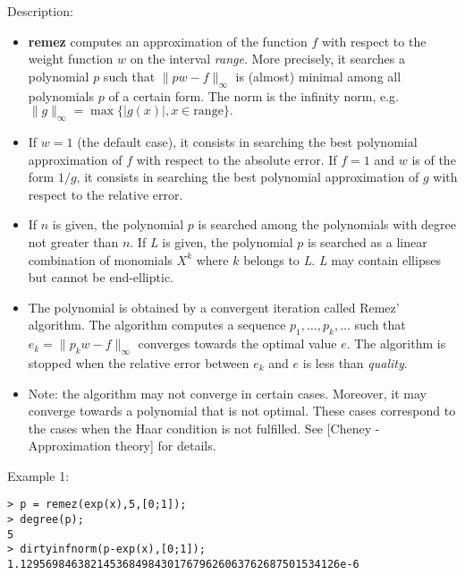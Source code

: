 \noindent Description: \begin{itemize}

\item \textbf{remez} computes an approximation of the function $f$ with respect to 
   the weight function $w$ on the interval \emph{range}. More precisely, it 
   searches a polynomial $p$ such that $\|pw-f\|_{\infty}$ is 
   (almost) minimal among all polynomials $p$ of a certain form. The norm is
   the infinity norm, e.g. $\|g\|_{\infty} = \max \{|g(x)|, x \in \mathrm{range}\}.$

\item If $w=1$ (the default case), it consists in searching the best 
   polynomial approximation of $f$ with respect to the absolute error.
   If $f=1$ and $w$ is of the form $1/g$, it consists in 
   searching the best polynomial approximation of $g$ with respect to the 
   relative error.

\item If $n$ is given, the polynomial $p$ is searched among the 
   polynomials with degree not greater than $n$.
   If \emph{L} is given, the polynomial $p$ is searched as a linear combination 
   of monomials $X^k$ where $k$ belongs to \emph{L}.
   \emph{L} may contain ellipses but cannot be end-elliptic.

\item The polynomial is obtained by a convergent iteration called Remez' algorithm. 
   The algorithm computes a sequence $p_1,\dots ,p_k,\dots$ 
   such that $e_k = \|p_k w-f\|_{\infty}$ converges towards 
   the optimal value $e$. The algorithm is stopped when the relative error 
   between $e_k$ and $e$ is less than \emph{quality}.

\item Note: the algorithm may not converge in certain cases. Moreover, it may 
   converge towards a polynomial that is not optimal. These cases correspond to 
   the cases when the Haar condition is not fulfilled.
   See [Cheney - Approximation theory] for details.
\end{itemize}
\noindent Example 1: 
\begin{center}\begin{minipage}{15cm}\begin{Verbatim}[frame=single]
> p = remez(exp(x),5,[0;1]);
> degree(p);
5
> dirtyinfnorm(p-exp(x),[0;1]);
1.12956984638214536849843017679626063762687501534126e-6
\end{Verbatim}
\end{minipage}\end{center}

